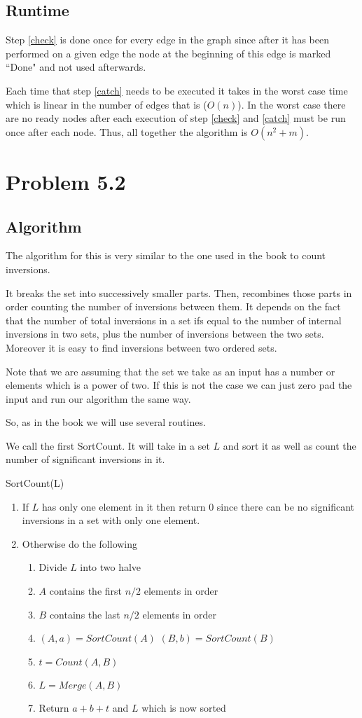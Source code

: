 \documentclass{article}
\begin{document}
\subsection{Runtime}
Step \ref{check} is done once for every edge in the graph since after it has been performed on a given edge the node at the beginning of this edge is marked ``Done" and not used afterwards.

Each time that step \ref{catch} needs to be executed it takes in the worst case time which is linear in the number of edges that is ($O(n)$). In the worst case there are no ready nodes after each execution of step \ref{check} and \ref{catch} must be run once after each node. Thus, all together the algorithm is $O(n^2+m)$.
\section{Problem 5.2}

\subsection{Algorithm}
The algorithm for this is very similar to the one used in the book to count inversions. 

It breaks the set into successively smaller parts. Then, recombines those parts in order counting the number of inversions between them. It depends on the fact that the number of total inversions in a set ifs equal to the number of internal inversions in two sets, plus the number of inversions between the two sets. Moreover it is easy to find inversions between two ordered sets.

Note that we are assuming that the set we take as an input has a number or elements which is a power of two. If this is not the case we can just zero pad the input and run our algorithm the same way.

So, as in the book we will use several routines. 

We call the first SortCount. It will take in a set $L$ and sort it as well as count the number of significant inversions in it. 

\begin{center}SortCount(L)\end{center}
\begin{enumerate}
\item If $L$ has only one element in it then return $0$ since there can be no significant inversions in a set with only one element.
\item Otherwise do the following
\begin{enumerate}
\item Divide $L$ into two halve
\item $A$ contains the first $n/2$ elements in order
\item $B$ contains the last $n/2$ elements in order
\item $ (A,a) = SortCount(A)$ $(B,b) =SortCount(B)$
\item $t = Count(A,B)$
\item $L = Merge(A,B)$
\item Return $a+b+t$ and $L$ which is now sorted
\end{enumerate}
\end{enumerate}
\end{document}
